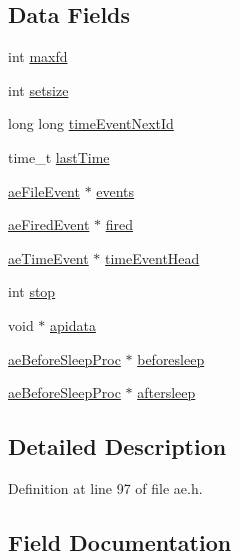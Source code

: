 \subsection*{Data Fields}
\begin{DoxyCompactItemize}
\item 
int \hyperlink{structae_event_loop_a7a13a361801dcc59ce4946736fa26726}{maxfd}
\item 
int \hyperlink{structae_event_loop_afcc4d6ce64e647b5ff70e04393e854cd}{setsize}
\item 
long long \hyperlink{structae_event_loop_a16573cf248b2aeb7ecacfc992ae774d4}{time\+Event\+Next\+Id}
\item 
time\+\_\+t \hyperlink{structae_event_loop_a9a8ce27fc2a03316649058e288233cf8}{last\+Time}
\item 
\hyperlink{structae_file_event}{ae\+File\+Event} $\ast$ \hyperlink{structae_event_loop_af7bb19dd3fc37f35b9b655455679ce56}{events}
\item 
\hyperlink{structae_fired_event}{ae\+Fired\+Event} $\ast$ \hyperlink{structae_event_loop_a3116c9bc1c9065f5ea86c4aee38ca2e2}{fired}
\item 
\hyperlink{structae_time_event}{ae\+Time\+Event} $\ast$ \hyperlink{structae_event_loop_aa46c6a447db443855daf5b08923bed36}{time\+Event\+Head}
\item 
int \hyperlink{structae_event_loop_a6c0af9f2e97842405fb15ed952ef2976}{stop}
\item 
void $\ast$ \hyperlink{structae_event_loop_a6c38ead7bed5299f416045c1940ee5b1}{apidata}
\item 
\hyperlink{ae_8h_a9b418f26d4997ba2d303dd247ae45718}{ae\+Before\+Sleep\+Proc} $\ast$ \hyperlink{structae_event_loop_a237a195466baef2c9cc26255774fd7cb}{beforesleep}
\item 
\hyperlink{ae_8h_a9b418f26d4997ba2d303dd247ae45718}{ae\+Before\+Sleep\+Proc} $\ast$ \hyperlink{structae_event_loop_a7a22ce87f685955512b3a0c049d5763c}{aftersleep}
\end{DoxyCompactItemize}


\subsection{Detailed Description}


Definition at line 97 of file ae.\+h.



\subsection{Field Documentation}
\mbox{\label{structae_event_loop_a7a22ce87f685955512b3a0c049d5763c}} 
